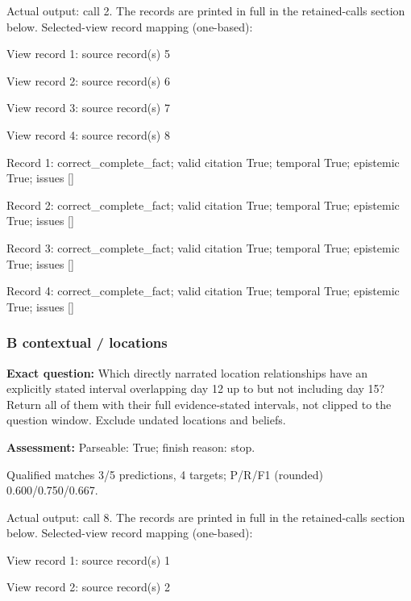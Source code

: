 Actual output: call 2. The records are printed in full in the retained-calls section below. Selected-view record mapping (one-based):

View record 1: source record(s) 5\par

View record 2: source record(s) 6\par

View record 3: source record(s) 7\par

View record 4: source record(s) 8\par

Record 1: correct\_complete\_fact; valid citation True; temporal True; epistemic True; issues []\par

Record 2: correct\_complete\_fact; valid citation True; temporal True; epistemic True; issues []\par

Record 3: correct\_complete\_fact; valid citation True; temporal True; epistemic True; issues []\par

Record 4: correct\_complete\_fact; valid citation True; temporal True; epistemic True; issues []\par

\subsubsection*{B contextual / locations}

\noindent\textbf{Exact question:} Which directly narrated location relationships have an explicitly stated interval overlapping day 12 up to but not including day 15? Return all of them with their full evidence-stated intervals, not clipped to the question window. Exclude undated locations and beliefs.\par

\noindent\textbf{Assessment:} Parseable: True; finish reason: stop.

Qualified matches 3/5 predictions, 4 targets; P/R/F1 (rounded) 0.600/0.750/0.667.\par

Actual output: call 8. The records are printed in full in the retained-calls section below. Selected-view record mapping (one-based):

View record 1: source record(s) 1\par

View record 2: source record(s) 2\par

